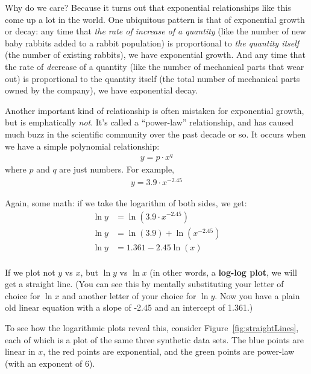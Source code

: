 \begin{enumerate}

Why do we care? Because it turns out that exponential relationships like this
come up a lot in the world. One ubiquitous pattern is that of exponential
growth or decay: any time that \textit{the rate of increase of a quantity}
(like the number of new baby rabbits added to a rabbit population) is
proportional to \textit{the quantity itself} (the number of existing rabbits),
we have exponential growth. And any time that the rate of \textit{de}crease of
a quantity (like the number of mechanical parts that wear out) is proportional
to the quantity itself (the total number of mechanical parts owned by the
company), we have exponential decay.

Another important kind of relationship is often mistaken for exponential
growth, but is emphatically \textit{not}. It's called a ``power-law''
relationship, and has caused much buzz in the scientific community over the
past decade or so. It occurs when we have a simple polynomial relationship:
\begin{align*}
y = p \cdot x^{q}
\end{align*}
where $p$ and $q$ are just numbers. For example,
\begin{align*}
y = 3.9 \cdot x^{-2.45}
\end{align*}

Again, some math: if we take the logarithm of both sides, we get:
\begin{align*}
\ln y &= \ln (3.9 \cdot x^{-2.45}) \\
\ln y &= \ln (3.9) + \ln (x^{-2.45}) \\
\ln y &= 1.361 -2.45 \ln (x) \\
\end{align*}
\normalsize

\vspace{-.25in}
If we plot not $y$ vs $x$, but $\ln y$ vs $\ln x$ (in other words, a
\textbf{log-log plot}, we will get a straight line. (You can see this by
mentally substituting your letter of choice for $\ln x$ and another letter of
your choice for $\ln y$. Now you have a plain old linear equation with a slope
of -2.45 and an intercept of 1.361.)

To see how the logarithmic plots reveal this, consider
Figure~\ref{fig:straightLines}, each of which is a plot of the same three
synthetic data sets. The blue points are linear in $x$, the red points are
exponential, and the green points are power-law (with an exponent of 6).


\end{enumerate}
